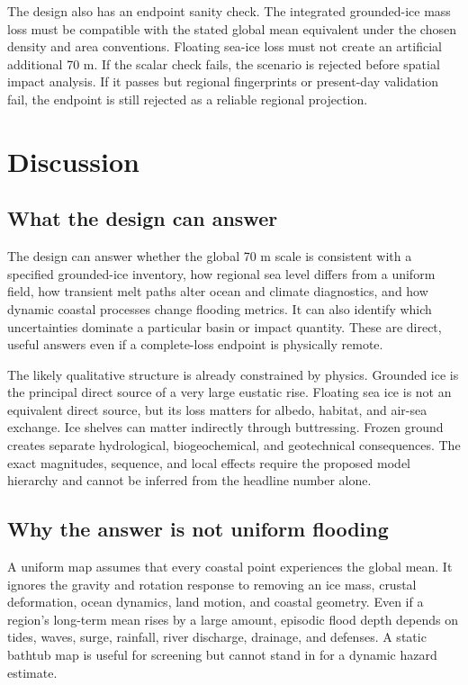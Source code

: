 \documentclass[conference]{IEEEtran}
\begin{document}
The design also has an endpoint sanity check. The integrated grounded-ice mass loss must be compatible with the stated global mean equivalent under the chosen density and area conventions. Floating sea-ice loss must not create an artificial additional 70 m. If the scalar check fails, the scenario is rejected before spatial impact analysis. If it passes but regional fingerprints or present-day validation fail, the endpoint is still rejected as a reliable regional projection.

\section{Discussion}

\subsection{What the design can answer}

The design can answer whether the global 70 m scale is consistent with a specified grounded-ice inventory, how regional sea level differs from a uniform field, how transient melt paths alter ocean and climate diagnostics, and how dynamic coastal processes change flooding metrics. It can also identify which uncertainties dominate a particular basin or impact quantity. These are direct, useful answers even if a complete-loss endpoint is physically remote.

The likely qualitative structure is already constrained by physics. Grounded ice is the principal direct source of a very large eustatic rise. Floating sea ice is not an equivalent direct source, but its loss matters for albedo, habitat, and air-sea exchange. Ice shelves can matter indirectly through buttressing. Frozen ground creates separate hydrological, biogeochemical, and geotechnical consequences. The exact magnitudes, sequence, and local effects require the proposed model hierarchy and cannot be inferred from the headline number alone.

\subsection{Why the answer is not uniform flooding}

A uniform map assumes that every coastal point experiences the global mean. It ignores the gravity and rotation response to removing an ice mass, crustal deformation, ocean dynamics, land motion, and coastal geometry. Even if a region's long-term mean rises by a large amount, episodic flood depth depends on tides, waves, surge, rainfall, river discharge, drainage, and defenses. A static bathtub map is useful for screening but cannot stand in for a dynamic hazard estimate.
\end{document}
